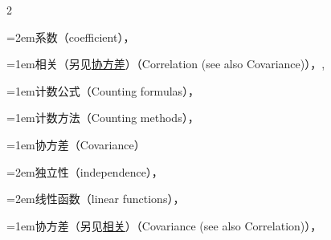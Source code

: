 \begin{multicols}{2}
\par\noindent\hangindent=2em\hspace*{1em}\label{idx:216}系数（coefficient），\hyperref[def:4.5.2]{\pageref*{def:4.5.2}}\par
\par\addvspace{2pt}
\par\noindent\hangindent=1em\hspace*{0em}\label{idx:217}相关（另见\hyperref[idx:220]{协方差}）（Correlation (see also Covariance)），\hyperref[def:4.5.2]{\pageref*{def:4.5.2}}, \hyperref[thm:4.5.7]{\pageref*{thm:4.5.7}}\par
\par\addvspace{2pt}
\par\noindent\hangindent=1em\hspace*{0em}\label{idx:218}计数公式（Counting formulas），\hyperref[tab:1.2.1]{\pageref*{tab:1.2.1}}\par
\par\addvspace{2pt}
\par\noindent\hangindent=1em\hspace*{0em}\label{idx:219}计数方法（Counting methods），\hyperref[sec:1.2.3]{\pageref*{sec:1.2.3}}\par
\par\addvspace{2pt}
\par\noindent\hangindent=1em\hspace*{0em}\label{idx:220}协方差（Covariance）\par
\par\noindent\hangindent=2em\hspace*{1em}\label{idx:221}独立性（independence），\hyperref[thm:4.5.5]{\pageref*{thm:4.5.5}}\par
\par\noindent\hangindent=2em\hspace*{1em}\label{idx:222}线性函数（linear functions），\hyperref[item:12.11.a]{\pageref*{item:12.11.a}}\par
\par\addvspace{2pt}
\par\noindent\hangindent=1em\hspace*{0em}\label{idx:223}协方差（另见\hyperref[idx:214]{相关}）（Covariance (see also Correlation)），\hyperref[def:4.5.1]{\pageref*{def:4.5.1}}\par
\par\addvspace{2pt}

\end{multicols}
